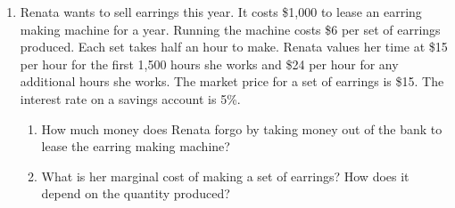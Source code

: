 \documentclass{article}
\begin{document}
\begin{enumerate}
\begin{enumerate}
	\item For each level of fixed cost, calculate Don's total cost for producing 20, 40, and 60 orders per week.
	
	\item If Don is producing 20 orders per week, how many trucks should he purchase and what will his average total cost be? If he produced 40 orders per week? 60?
	
	\end{enumerate}
	
	Assume that Don purchased 3 trucks, expecting to produce 40 orders per week.
	
	\begin{enumerate}
	
	\setcounter{enumii}{2}
	\item Suppose that in the short run, business declines to 20 orders per week. What is Don's average total cost in the short run? What will his average total cost per order in the short run be if his business booms to 60 orders per week?
	
	\item What is Don's long-run average total cost for 20 orders per week? Explain why his short-run average total cost of producing 20 orders per week when the number of trucks is fixed at 3 is greater than his long-run average total cost of producing 20 orders per week.
	
	\end{enumerate}
	
(Flip) \newpage
	
\item Renata wants to sell earrings this year. It costs \$1,000 to lease an earring making machine for a year. Running the machine costs \$6 per set of earrings produced. Each set takes half an hour to make. Renata values her time at \$15 per hour for the first 1,500 hours she works and \$24 per hour for any additional hours she works. The market price for a set of earrings is \$15. The interest rate on a savings account is 5\%.

	\begin{enumerate}
	
	\item How much money does Renata forgo by taking money out of the bank to lease the earring making machine?
	
	\item What is her marginal cost of making a set of earrings? How does it depend on the quantity produced?
	

\end{enumerate}
\end{enumerate}
\end{document}
